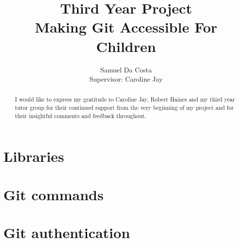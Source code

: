 \documentclass[a4paper]{report}
\begin{document}
\newcommand{\fig}[4]{

\begin{figure} 
    \centering
    \texttt{[image: \#1]}
    \caption{#2}
    \label{#3}
\end{figure}


}
\title{Third Year Project \\
\large Making Git Accessible For Children \\
}
\author{Samuel Da Costa\\
Supervisor: Caroline Jay}
\maketitle


\begin{abstract}

\end{abstract}

\renewcommand{\abstractname}{Acknowledgements}
\begin{abstract}
I would like to express my gratitude to Caroline Jay, Robert Haines and my third year tutor group for their continued support from the very beginning of my project and for their insightful comments and feedback throughout.

\end{abstract}

\tableofcontents







\begin{appendices}

\chapter{Libraries}\label{appendix_libraries}



\chapter{Git commands}\label{appendix_plumbing}



\chapter{Git authentication}\label{appendix_gitauth}




\end{appendices}

%
%
\end{document}
